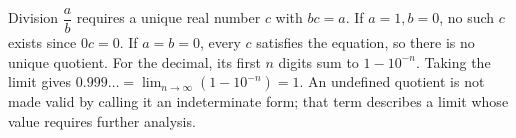Division $\dfrac{a}{b}$ requires a unique real number $c$ with $bc=a$. If $a=1,b=0$, no such $c$ exists since $0c=0$. If $a=b=0$, every $c$ satisfies the equation, so there is no unique quotient. For the decimal, its first $n$ digits sum to $1-10^{-n}$. Taking the limit gives $0.999\ldots=\lim_{n\to\infty}(1-10^{-n})=\boxed{1}$. An undefined quotient is not made valid by calling it an indeterminate form; that term describes a limit whose value requires further analysis.
